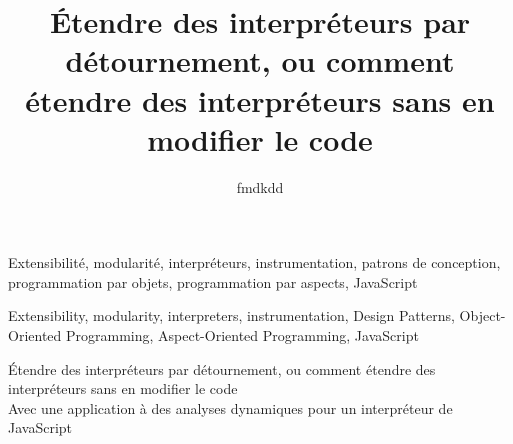 

\newcommand{\titlefr}{Étendre des interpréteurs par détournement, ou comment étendre des interpréteurs sans en modifier le code}
\newcommand{\subtitlefr}{Avec une application à des analyses dynamiques pour un interpréteur de JavaScript}
\newcommand{\titleen}{Extending interpreters by diverting, or how to extend interpreters without modifying their source code}
\newcommand{\versiontag}{1.0.1}

\title{\titlefr}
\author{fmdkdd}





\begin{resume}

\end{resume}

\begin{motscles}
Extensibilité, modularité, interpréteurs, instrumentation, patrons de
conception, programmation par objets, programmation par aspects, JavaScript
\end{motscles}

\begin{abstract_}

\end{abstract_}

\begin{keywords}
Extensibility, modularity, interpreters, instrumentation, Design Patterns,
Object-Oriented Programming, Aspect-Oriented Programming, JavaScript
\end{keywords}




\frontmatter
\pagestyle{front}

\cleartorecto


\begin{flushleft}
{\LARGE\titlefr}\\
\vspace{\baselineskip}
{\Large\subtitlefr}
\end{flushleft}

